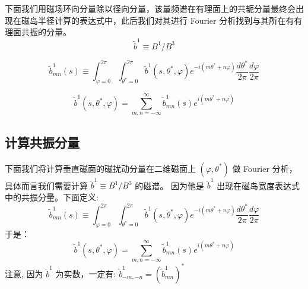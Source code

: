 下面我们用磁场环向分量除以径向分量，该量频谱在有理面上的共轭分量最终会出现在磁岛半径计算的表达式中，此后我们对其进行 Fourier 分析找到与其所在有有理面共振的分量。
\begin{equation}
  \tilde{b}^{1} \equiv B^{1} / B^{3}
\end{equation}


\begin{equation}
  \tilde{b}_{m n}^{1}(s) \equiv \int_{\varphi=0}^{2 \pi} \int_{\theta^{*}=0}^{2 \pi} \tilde{b}^{1}\left(s, \theta^{*}, \varphi\right) e^{-i\left(m \theta^{*}+n \varphi\right)} \frac{d \theta^{*}}{2 \pi} \frac{d \varphi}{2 \pi}
\end{equation}

\begin{equation}
  \tilde{b}^{1}\left(s, \theta^{*}, \varphi\right)=\sum_{m, n=-\infty}^{\infty} \tilde{b}_{m n}^{1}(s) e^{i\left(m \theta^{*}+n \varphi\right)}
\end{equation}

  
\subsection{计算共振分量}

下面我们将计算垂直磁面的磁扰动分量在二维磁面上 $(\varphi, \theta^{*})$ 做 Fourier 分析，具体而言我们需要计算 $\tilde{b}^{1} \equiv B^{1} / B^{3}$ 的磁谱。
因为他是 $\tilde{b}^{1}$ 出现在磁岛宽度表达式中的共振分量。下面定义:
\[
\tilde{b}_{m n}^{1}(s) \equiv \int_{\varphi=0}^{2 \pi} \int_{\theta^{*}=0}^{2 \pi} \tilde{b}^{1}\left(s, \theta^{*}, \varphi\right) e^{-i\left(m \theta^{*}+n \varphi\right)} \frac{d \theta^{*}}{2 \pi} \frac{d \varphi}{2 \pi}
\]
于是：
\[
\tilde{b}^{1}\left(s, \theta^{*}, \varphi\right)=\sum_{m, n=-\infty}^{\infty} \tilde{b}_{m n}^{1}(s) e^{i\left(m \theta^{*}+n \varphi\right)}
\]
注意, 因为 $\tilde{b}^{1}$ 为实数，一定有:
$\tilde{b}_{-m,-n}^{1}=\left(\tilde{b}_{m n}^{1}\right)^{*}$


